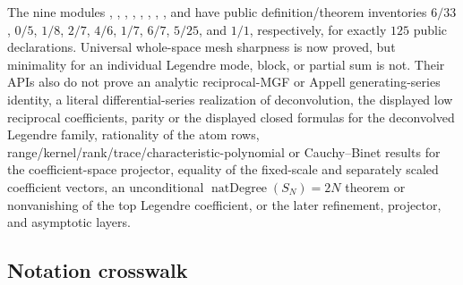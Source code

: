\documentclass[11pt,oneside]{article}
\theoremstyle{definition}
\theoremstyle{remark}
\begin{document}
The nine modules ,
,
,
,
,
,
,
, and
 have public definition/theorem
inventories $6/33$, $0/5$, $1/8$, $2/7$, $4/6$, $1/7$, $6/7$, $5/25$, and
$1/1$, respectively, for exactly $125$ public declarations.  Universal
whole-space mesh sharpness is now proved, but minimality for an individual Legendre mode,
block, or partial sum is not.  Their APIs also do not prove an analytic
reciprocal-MGF or Appell generating-series identity, a literal differential-series
realization of deconvolution, the displayed low reciprocal coefficients, parity or the
displayed closed formulas for the deconvolved Legendre family, rationality of the atom rows,
range/kernel/rank/trace/characteristic-polynomial or Cauchy--Binet results for the
coefficient-space projector,
equality of the fixed-scale and separately scaled coefficient vectors, an unconditional
$\operatorname{natDegree}(S_N)=2N$ theorem or nonvanishing of the top Legendre coefficient, or the later
refinement, projector, and asymptotic layers.

\subsection{Notation crosswalk}
\label{integration:app:notation}
\end{document}
